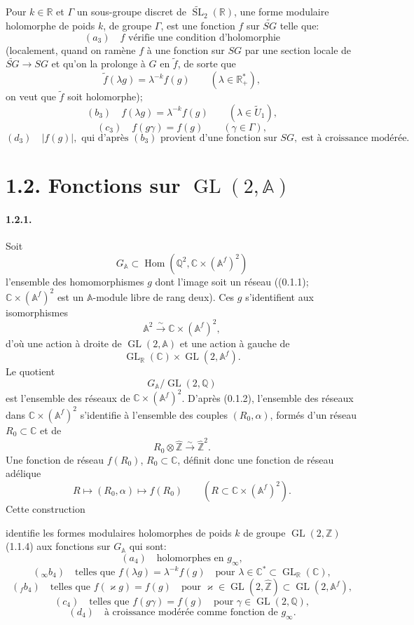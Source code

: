 \documentclass[10pt,a4paper]{article}
\providecommand{\GL}{\operatorname{GL}}
\providecommand{\SL}{\operatorname{SL}}
\providecommand{\Hom}{\operatorname{Hom}}
\providecommand{\R}{\mathbb R}
\providecommand{\Q}{\mathbb Q}
\providecommand{\Z}{\mathbb Z}
\providecommand{\C}{\mathbb C}
\providecommand{\A}{\mathbb A}
\providecommand{\Af}{\mathbb A^f}
\providecommand{\GA}{G_{\mathbb A}}
\providecommand{\iso}{\xrightarrow{\sim}}
\begin{document}
Pour \(k\in\R\) et \(\Gamma\) un sous-groupe discret de \(\widetilde{\SL}_2(\R)\), une forme modulaire holomorphe de poids \(k\), de groupe \(\Gamma\), est une fonction \(f\) sur \(\widetilde{SG}\) telle que:
\[
(a_3)\quad
f\text{ vérifie une condition d'holomorphie}
\]
(localement, quand on ramène \(f\) à une fonction sur \(SG\) par une section locale de \(\widetilde{SG}\to SG\) et qu'on la prolonge à \(G\) en \(\widetilde f\), de sorte que
\[
\widetilde f(\lambda g)=\lambda^{-k}f(g)\qquad(\lambda\in\R_+^*),
\]
on veut que \(\widetilde f\) soit holomorphe);
\[
(b_3)\quad f(\lambda g)=\lambda^{-k}f(g)\qquad(\lambda\in\widetilde U_1),
\]
\[
(c_3)\quad f(g\gamma)=f(g)\qquad(\gamma\in\Gamma),
\]
\[
(d_3)\quad |f(g)|,\text{ qui d'après }(b_3)\text{ provient d'une fonction sur }SG,\text{ est à croissance modérée.}
\]

\section*{1.2. Fonctions sur \(\GL(2,\A)\)}

\paragraph{1.2.1.} Soit
\[
\GA\subset\Hom(\Q^2,\C\times(\Af)^2)
\]
l'ensemble des homomorphismes \(g\) dont l'image soit un réseau ((0.1.1); \(\C\times(\Af)^2\) est un \(\A\)-module libre de rang deux). Ces \(g\) s'identifient aux isomorphismes
\[
\A^2\iso\C\times(\Af)^2,
\]
d'où une action à droite de \(\GL(2,\A)\) et une action à gauche de
\[
\GL_{\R}(\C)\times\GL(2,\Af).
\]
Le quotient
\[
\GA/\GL(2,\Q)
\]
est l'ensemble des réseaux de \(\C\times(\Af)^2\). D'après (0.1.2), l'ensemble des réseaux dans \(\C\times(\Af)^2\) s'identifie à l'ensemble des couples \((R_0,\alpha)\), formés d'un réseau \(R_0\subset\C\) et de
\[
R_0\otimes\widehat{\Z}\iso\widehat{\Z}^2.
\]
Une fonction de réseau \(f(R_0)\), \(R_0\subset\C\), définit donc une fonction de réseau adélique
\[
R\longmapsto(R_0,\alpha)\longmapsto f(R_0)
\qquad(R\subset\C\times(\Af)^2).
\]
Cette construction

\clearpage
{}
\hypertarget{authority-16}{}
identifie les formes modulaires holomorphes de poids $k$ de groupe $\GL(2,\Z)$ (1.1.4) aux fonctions sur $\GA$ qui sont:
\[
(a_4)\quad \text{holomorphes en }g_\infty,
\]
\[
({}_{\infty}b_4)\quad\text{telles que }f(\lambda g)=\lambda^{-k}f(g)\quad\text{pour }\lambda\in\C^*\subset\GL_{\R}(\C),
\]
\[
({}_{f}b_4)\quad\text{telles que }f(\varkappa g)=f(g)\quad\text{pour }\varkappa\in\GL(2,\widehat{\Z})\subset\GL(2,\Af),
\]
\[
(c_4)\quad\text{telles que }f(g\gamma)=f(g)\quad\text{pour }\gamma\in\GL(2,\Q),
\]
\[
(d_4)\quad \text{à croissance modérée comme fonction de }g_\infty.
\]
\end{document}
